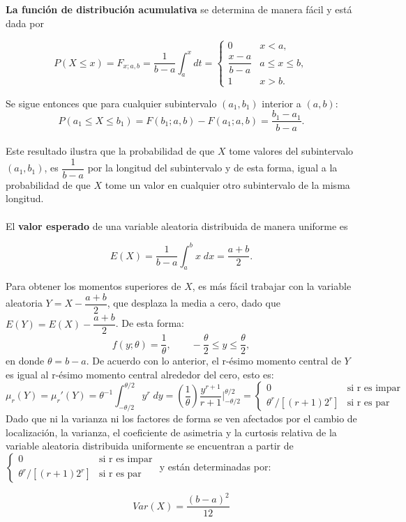 \textbf{La función de distribución acumulativa} se determina de manera fácil y está dada por
\begin{tcolorbox}
    $$P(X\leq x)=F_{x;a,b}=\dfrac{1}{b-a}\int_a^x dt = \left\{\begin{array}{ll}
	    0 & x<a,\\
	    \dfrac{x-a}{b-a} & a\leq x\leq b,\\
	    1 & x>b.
	\end{array}\right.$$
\end{tcolorbox}

Se sigue entonces que para cualquier subintervalo $(a_1,b_1)$ interior a $(a,b)$:
$$P(a_1\leq X\leq b_1)=F(b_1;a,b)-F(a_1;a,b)=\dfrac{b_1-a_1}{b-a}.$$\\

Este resultado ilustra que la probabilidad de que $X$ tome valores del subintervalo $\left(a_1,b_1\right)$, es $\dfrac{1}{b-a}$ por la longitud del subintervalo y de esta forma, igual a la probabilidad de que $X$ tome un valor en cualquier otro subintervalo de la misma longitud.\\\\

El \textbf{valor esperado} de una variable aleatoria distribuida de manera uniforme es 

\begin{tcolorbox}
    $$E(X)=\dfrac{1}{b-a}\int_a^b x\;dx = \dfrac{a+b}{2}.$$
\end{tcolorbox}

Para obtener los momentos superiores de $X$, es más fácil trabajar con la variable aleatoria $Y=X-\dfrac{a+b}{2}$, que desplaza la media a cero, dado que $E(Y)=E(X)-\dfrac{a+b}{2}$. De esta forma:
$$f(y;\theta)=\dfrac{1}{\theta},\qquad -\dfrac{\theta}{2}\leq y\leq \dfrac{\theta}{2},$$
en donde $\theta=b-a.$ De acuerdo con lo anterior, el r-ésimo momento central de $Y$ es igual al r-ésimo momento central alrededor del cero, esto es:
$$\mu_r(Y)=\mu_r'(Y)=\theta^{-1}\int_{-\theta/2}^{\theta/2}y^r \; dy = \left(\dfrac{1}{\theta}\right)\dfrac{y^{r+1}}{r+1}\bigg|_{-\theta/2}^{\theta/2}=\left\{\begin{array}{ll}0&\mbox{si r es impar}\\ \theta^r/[(r+1)2^r]&\mbox{si r es par}\end{array}\right.$$
Dado que ni la varianza ni los factores de forma se ven afectados por el cambio de localización, la varianza, el coeficiente de asimetria y la curtosis relativa de la variable aleatoria distribuida uniformente se encuentran a partir de $\left\{\begin{array}{ll}0&\mbox{si r es impar}\\ \theta^r/[(r+1)2^r]&\mbox{si r es par}\end{array}\right.$ y están determinadas por:
\begin{tcolorbox}
    $$Var(X)=\dfrac{(b-a)^2}{12}$$
\end{tcolorbox}

